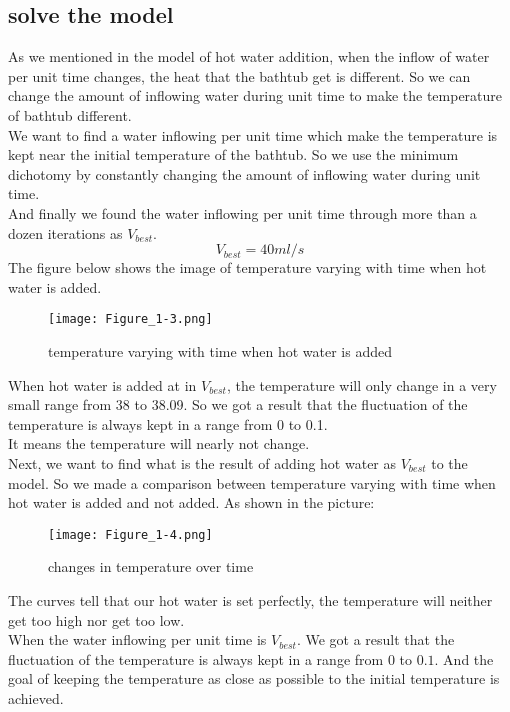 \documentclass{mcmthesis}
\begin{document}
\subsection{solve the model}%
\indent As we mentioned in the model of hot water addition, when the inflow of water per unit time changes, the heat that the bathtub get is different. So we can change the amount of inflowing water during unit time to make the temperature of bathtub different.\\ 
\indent We want to find a water inflowing per unit time which make the temperature is kept near the initial temperature of the bathtub. 
So we use the minimum dichotomy by constantly changing the amount of inflowing water during unit time. \\			
\indent And finally we found the water inflowing per unit time through more than a dozen iterations as $V_{best}$.\\
\begin{equation}
	V_{best}=40ml/s
\end{equation}
\indent The figure below shows the image of temperature varying with time when hot water is added.
\begin{figure}[H]	%
\centerline{\texttt{[image: Figure\_1-3.png]}}
\caption{temperature varying with time when hot water is added}
\label{oval}	
\end{figure}
\indent When hot water is added at in $V_{best}$, the temperature will only change in a very small range from 38 to 38.09. So we got a result that the fluctuation of the temperature is always kept in a range from 0 to 0.1. \\
\indent It means the temperature will nearly not change.\\
\indent Next, we want to find what is the result of adding hot water as $V_{best}$ to the model. So we made a comparison between temperature varying with time when hot water is added and not added. As shown in the picture:
\begin{figure}[H]	%
\centerline{\texttt{[image: Figure\_1-4.png]}}
\caption{changes in temperature over time}
\label{oval}	
\end{figure}
\indent The curves tell that our hot water is set perfectly, the temperature will neither get too high nor get too low. \\
\indent When the water inflowing per unit time is $V_{best}$. We got a result that the fluctuation of the temperature is always kept in a range from $0$ to $0.1$. And the goal of keeping the temperature as close as possible to the initial temperature is achieved.
\end{document}
